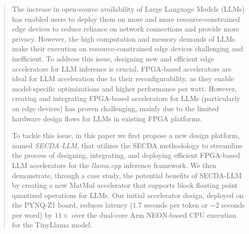 \documentclass[10pt, conference]{IEEEtran}
\begin{document}
\begin{abstract}


The increase in open-source availability of Large Language Models (LLMs) has enabled users to deploy them on more and more resource-constrained edge devices to reduce reliance on network connections and provide more privacy.
However, the high computation and memory demands of LLMs make their execution on resource-constrained edge devices challenging and inefficient.
To address this issue, designing new and efficient edge accelerators for LLM inference is crucial. FPGA-based accelerators are ideal for LLM acceleration due to their reconfigurability, as they enable model-specific optimizations and higher performance per watt.
However, creating and integrating FPGA-based accelerators for LLMs (particularly on edge devices) has proven challenging, mainly due to the limited hardware design flows for LLMs in existing FPGA platforms.

To tackle this issue, in this paper we first propose a new design platform, named \textit{SECDA-LLM}, that utilizes the SECDA methodology to streamline the process of designing, integrating, and deploying efficient FPGA-based LLM accelerators for the \textit{llama.cpp} inference framework.
We then demonstrate, through a case study, the potential benefits of SECDA-LLM by creating a new MatMul accelerator that supports block floating point quantized operations for LLMs.
Our initial accelerator design, deployed on the PYNQ-Z1 board, reduces latency ($1.7$ seconds per token or $\sim2$ seconds per word) by $11\times$ over the dual-core Arm NEON-based CPU execution for the TinyLlama model.





\end{abstract}
\end{document}
